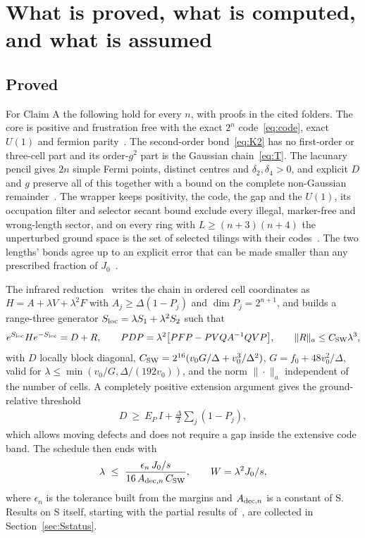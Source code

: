 \documentclass[11pt]{article}
\theoremstyle{definition}
\begin{document}
\section{What is proved, what is computed, and what is assumed}

\subsection{Proved}

For Claim A the following hold for every $n$, with proofs in the cited folders. The core is positive and frustration free with the exact $2^n$ code~\eqref{eq:code}, exact $U(1)$ and fermion parity~\cite{C39}. The second-order bond~\eqref{eq:K2} has no first-order or three-cell part and its order-$g^2$ part is the Gaussian chain~\eqref{eq:T}. The lacunary pencil gives $2n$ simple Fermi points, distinct centres and $\delta_2,\delta_4>0$, and explicit $D$ and $g$ preserve all of this together with a bound on the complete non-Gaussian remainder~\cite{C39,C42}. The wrapper keeps positivity, the code, the gap and the $U(1)$, its occupation filter and selector secant bound exclude every illegal, marker-free and wrong-length sector, and on every ring with $L\ge(n+3)(n+4)$ the unperturbed ground space is the set of selected tilings with their codes~\cite{C44}. The two lengths' bonds agree up to an explicit error that can be made smaller than any prescribed fraction of $J_0$~\cite{C44}.

The infrared reduction~\cite{C45} writes the chain in ordered cell coordinates as $H=A+\lambda V+\lambda^2F$ with $A_j\ge\Delta(1-P_j)$ and $\dim P_j=2^{n+1}$, and builds a range-three generator $S_{\rm loc}=\lambda S_1+\lambda^2S_2$ such that
\begin{align}
e^{S_{\rm loc}}He^{-S_{\rm loc}}=D+R,\qquad PDP=\lambda^2\big[PFP-PVQA^{-1}QVP\big],\qquad \|R\|_a\le C_{\rm SW}\lambda^3,
\label{eq:SW}
\end{align}
with $D$ locally block diagonal, $C_{\rm SW}=2^{16}(v_0G/\Delta+v_0^3/\Delta^2)$, $G=f_0+48v_0^2/\Delta$, valid for $\lambda\le\min(v_0/G,\Delta/(192v_0))$, and the norm $\|\cdot\|_a$ independent of the number of cells. A completely positive extension argument gives the ground-relative threshold
\begin{align}
D\ \ge\ E_P\,I+\frac{\Delta}{2}\sum_j(1-P_j),
\label{eq:threshold}
\end{align}
which allows moving defects and does not require a gap inside the extensive code band. The schedule then ends with
\begin{align}
\lambda\ \le\ \frac{\epsilon_n\,J_0/s}{16\,A_{{\rm dec},n}\,C_{\rm SW}},\qquad W=\lambda^2J_0/s,
\label{eq:lambda}
\end{align}
where $\epsilon_n$ is the tolerance built from the margins and $A_{{\rm dec},n}$ is a constant of S. Results on S itself, starting with the partial results of~\cite{C46}, are collected in Section~\ref{sec:Sstatus}.
\end{document}
